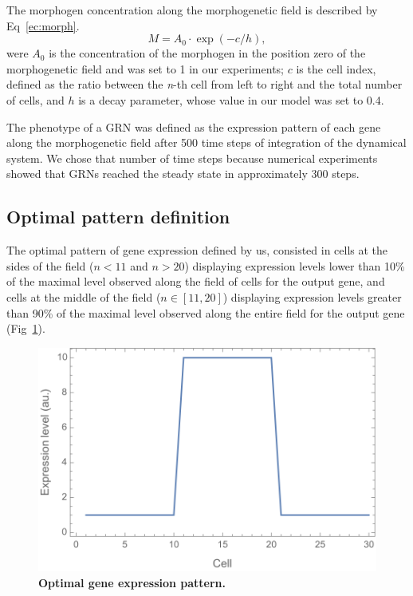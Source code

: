\documentclass[10pt,letterpaper]{article}
\begin{document}
The morphogen concentration along the morphogenetic field is described by 
Eq~\ref{ec:morph}.
\begin{equation}
 M = A_0 \cdot \exp(-c/h),
 \label{ec:morph}
\end{equation}
\noindent
were $A_0$ is the concentration of the morphogen in the position zero of the 
morphogenetic field and was set to 1 in our experiments; $c$ is the cell index, 
defined as the ratio between the \emph{n}-th cell from left to right and the 
total number of cells, and $h$ is a decay parameter, whose value in our model 
was set to 0.4.

The phenotype of a GRN was defined as the expression pattern of each gene along 
the morphogenetic field after 500 time steps of integration of the dynamical 
system. We chose that number of time steps because numerical experiments showed 
that GRNs reached the steady state in approximately 300 steps.

\subsection*{Optimal pattern definition}

The optimal pattern of gene expression defined by us, consisted in cells at the 
sides of the field ($n<11$ and $n>20$) displaying expression levels lower than 
10\% of the maximal level observed along the field of cells for the output gene,
and cells at the middle of the field ($n ∈ [11,20]$) displaying expression 
levels greater than 90\% of the maximal level observed along the entire field 
for the output gene (Fig~\ref{fig:exp-pattern}).

\begin{figure}[!h]
 \includegraphics[width=\textwidth]{figures/metodos/optimal-pattern}
 \caption{\bf Optimal gene expression pattern.}
 \label{fig:exp-pattern}
\end{figure}
\end{document}
